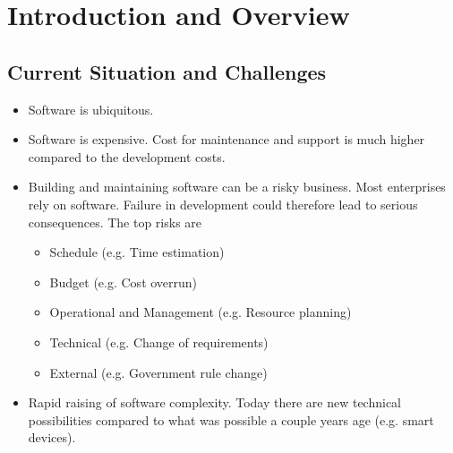 \chapter{Introduction and Overview}
\section{Current Situation and Challenges}
\begin{itemize}
\item Software is ubiquitous.
\item Software is expensive. Cost for maintenance and support is much
higher compared to the development costs.
\item Building and maintaining software can be a risky business. Most
enterprises rely on software. Failure in development could therefore lead
to serious consequences. The top risks are
\begin{itemize}
\item Schedule (e.g. Time estimation)
\item Budget (e.g. Cost overrun)
\item Operational and Management (e.g. Resource planning)
\item Technical (e.g. Change of requirements)
\item External (e.g. Government rule change)
\end{itemize}


\item Rapid raising of software complexity. Today there are new technical
possibilities compared to what was possible a couple years age
(e.g. smart devices).

\end{itemize}
